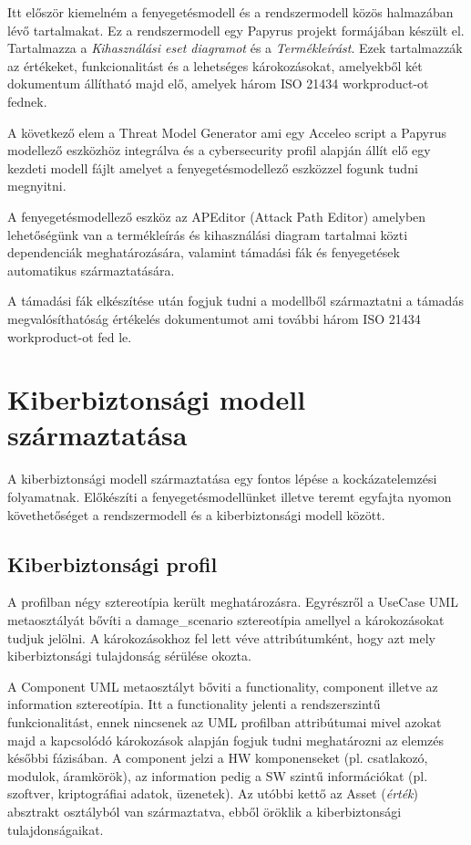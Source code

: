 Itt először kiemelném a fenyegetésmodell és a rendszermodell közös halmazában lévő tartalmakat. Ez a rendszermodell egy Papyrus projekt formájában készült el. Tartalmazza a \textit{Kihasználási eset diagramot} és a \textit{Termékleírást}. Ezek tartalmazzák az értékeket, funkcionalitást és a lehetséges károkozásokat, amelyekből két dokumentum állítható majd elő, amelyek három ISO 21434 workproduct-ot fednek. 

A következő elem a Threat Model Generator ami egy Acceleo script a Papyrus modellező eszközhöz integrálva és a cybersecurity profil alapján állít elő egy kezdeti modell fájlt amelyet a fenyegetésmodellező eszközzel fogunk tudni megnyitni.

A fenyegetésmodellező eszköz az APEditor (Attack Path Editor) amelyben lehetőségünk van a termékleírás és kihasználási diagram tartalmai közti dependenciák meghatározására, valamint támadási fák és fenyegetések automatikus származtatására.

A támadási fák elkészítése után fogjuk tudni a modellből származtatni a támadás megvalósíthatóság értékelés dokumentumot ami további három ISO 21434 workproduct-ot fed le.

\section{Kiberbiztonsági modell származtatása}

A kiberbiztonsági modell származtatása egy fontos lépése a kockázatelemzési folyamatnak. Előkészíti a fenyegetésmodellünket illetve teremt egyfajta nyomon követhetőséget a rendszermodell és a kiberbiztonsági modell között.

\subsection{Kiberbiztonsági profil}

A profilban négy sztereotípia került meghatározásra. Egyrészről a UseCase UML metaosztályát bővíti a damage\_scenario sztereotípia amellyel a károkozásokat tudjuk jelölni. A károkozásokhoz fel lett véve attribútumként, hogy azt mely kiberbiztonsági tulajdonság sérülése okozta.

A Component UML metaosztályt bőviti a functionality, component illetve az information sztereotípia. Itt a functionality jelenti a rendszerszintű funkcionalitást, ennek nincsenek az UML profilban attribútumai mivel azokat majd a kapcsolódó károkozások alapján fogjuk tudni meghatározni az elemzés későbbi fázisában. A component jelzi a HW komponenseket (pl. csatlakozó, modulok, áramkörök), az information pedig a SW szintű információkat (pl. szoftver, kriptográfiai adatok, üzenetek). Az utóbbi kettő az Asset (\textit{érték}) absztrakt osztályból van származtatva, ebből öröklik a kiberbiztonsági tulajdonságaikat.

